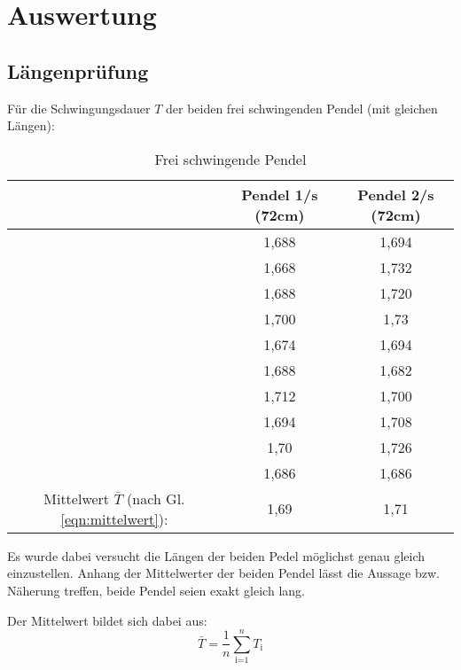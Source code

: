 \newpage
\section{Auswertung}
\label{sec:Auswertung}
\subsection{Längenprüfung}
Für die Schwingungsdauer $T$ der beiden frei schwingenden Pendel (mit gleichen Längen):

\begin{table}
    \centering
    \label{tab:Data_freischwingend}
    \begin{tabular}{c c | c}
        \toprule
         & Pendel 1\;/\;s (72cm) & Pendel 2\;/\;s (72cm)\\
        \midrule
        & 1,688 & 1,694 \\
        & 1,668 & 1,732 \\
        & 1,688 & 1,720  \\
        & 1,700  & 1,73  \\
        & 1,674 & 1,694 \\
        & 1,688 & 1,682 \\
        & 1,712 & 1,700   \\
        & 1,694 & 1,708 \\
        & 1,70  & 1,726 \\
        & 1,686 & 1,686 \\
        \midrule
        Mittelwert $\bar{T}$ (nach Gl. \ref{eqn:mittelwert}): & 1,69 & 1,71 \\
        \bottomrule
    \end{tabular} 
    \caption{Frei schwingende Pendel}
\end{table}

Es wurde dabei versucht die Längen der beiden Pedel möglichst genau gleich einzustellen.
Anhang der Mittelwerter der beiden Pendel lässt die Aussage bzw. Näherung treffen, beide Pendel seien exakt gleich lang.

Der Mittelwert bildet sich dabei aus:
\begin{equation}
    \bar{T}=\frac{1}{n}\sum_{\textrm{i=1}}^n T_\textrm{i}
    \label{eqn:mittelwert}
\end{equation}
\newpage
